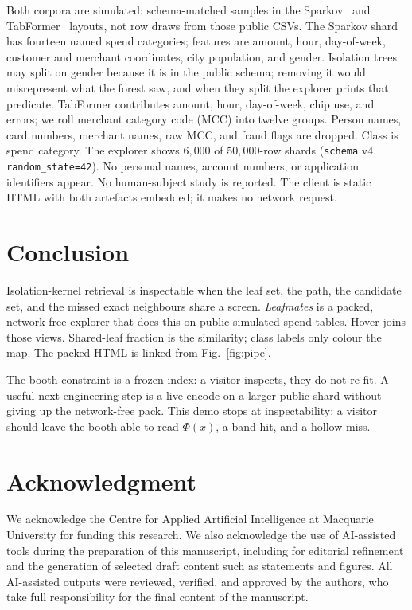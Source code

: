 \documentclass[conference]{IEEEtran}
\newcommand{\sys}{\emph{Leafmates}}
\begin{document}
Both corpora are simulated: schema-matched samples in the Sparkov~\cite{Harris2016Sparkov} and TabFormer~\cite{Padhi2021TabFormer} layouts, not row draws from those public CSVs. The Sparkov shard has fourteen named spend categories; features are amount, hour, day-of-week, customer and merchant coordinates, city population, and gender. Isolation trees may split on gender because it is in the public schema; removing it would misrepresent what the forest saw, and when they split the explorer prints that predicate. TabFormer contributes amount, hour, day-of-week, chip use, and errors; we roll merchant category code (MCC) into twelve groups. Person names, card numbers, merchant names, raw MCC, and fraud flags are dropped. Class is spend category. The explorer shows $6{,}000$ of $50{,}000$-row shards (\texttt{schema} v4, \texttt{random\_state=42}). No personal names, account numbers, or application identifiers appear. No human-subject study is reported. The client is static HTML with both artefacts embedded; it makes no network request.

\section{Conclusion}

Isolation-kernel retrieval is inspectable when the leaf set, the path, the candidate set, and the missed exact neighbours share a screen. \sys{} is a packed, network-free explorer that does this on public simulated spend tables. Hover joins those views. Shared-leaf fraction is the similarity; class labels only colour the map. The packed HTML is linked from Fig.~\ref{fig:pipe}.

The booth constraint is a frozen index: a visitor inspects, they do not re-fit. A useful next engineering step is a live encode on a larger public shard without giving up the network-free pack. This demo stops at inspectability: a visitor should leave the booth able to read $\Phi(x)$, a band hit, and a hollow miss.

\section*{Acknowledgment}
We acknowledge the Centre for Applied Artificial Intelligence at Macquarie University for funding this research. We also acknowledge the use of AI-assisted tools during the preparation of this manuscript, including for editorial refinement and the generation of selected draft content such as statements and figures. All AI-assisted outputs were reviewed, verified, and approved by the authors, who take full responsibility for the final content of the manuscript.



\end{document}
